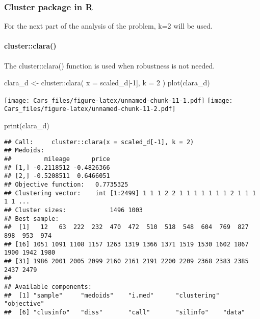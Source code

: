 \documentclass[
]{article}
\newenvironment{Shaded}{\begin{snugshade}}{\end{snugshade}}
\newcommand{\AttributeTok}[1]{\textcolor[rgb]{0.77,0.63,0.00}{#1}}
\newcommand{\DecValTok}[1]{\textcolor[rgb]{0.00,0.00,0.81}{#1}}
\newcommand{\FunctionTok}[1]{\textcolor[rgb]{0.00,0.00,0.00}{#1}}
\newcommand{\NormalTok}[1]{#1}
\newcommand{\OtherTok}[1]{\textcolor[rgb]{0.56,0.35,0.01}{#1}}
\newcommand{\SpecialCharTok}[1]{\textcolor[rgb]{0.00,0.00,0.00}{#1}}
\begin{document}
\hypertarget{cluster-package-in-r}{%
\subsubsection{Cluster package in R}\label{cluster-package-in-r}}

For the next part of the analysis of the problem, k=2 will be used.

\hypertarget{clusterclara}{%
\paragraph{cluster::clara()}\label{clusterclara}}

The cluster::clara() function is used when robustness is not needed.

\begin{Shaded}
\begin{Highlighting}[]
\NormalTok{clara\_d }\OtherTok{\textless{}{-}}\NormalTok{ cluster}\SpecialCharTok{::}\FunctionTok{clara}\NormalTok{(}
  \AttributeTok{x =}\NormalTok{ scaled\_d[}\SpecialCharTok{{-}}\DecValTok{1}\NormalTok{],}
  \AttributeTok{k =} \DecValTok{2}
\NormalTok{)}
\FunctionTok{plot}\NormalTok{(clara\_d)}
\end{Highlighting}
\end{Shaded}

\texttt{[image: Cars\_files/figure-latex/unnamed-chunk-11-1.pdf]}
\texttt{[image: Cars\_files/figure-latex/unnamed-chunk-11-2.pdf]}

\begin{Shaded}
\begin{Highlighting}[]
\FunctionTok{print}\NormalTok{(clara\_d)}
\end{Highlighting}
\end{Shaded}

\begin{verbatim}
## Call:     cluster::clara(x = scaled_d[-1], k = 2) 
## Medoids:
##         mileage      price
## [1,] -0.2118512 -0.4826366
## [2,] -0.5208511  0.6466051
## Objective function:   0.7735325
## Clustering vector:    int [1:2499] 1 1 1 2 2 1 1 1 1 1 1 1 2 1 1 1 1 1 ...
## Cluster sizes:            1496 1003 
## Best sample:
##  [1]   12   63  222  232  470  472  510  518  548  604  769  827  898  953  974
## [16] 1051 1091 1108 1157 1263 1319 1366 1371 1519 1530 1602 1867 1900 1942 1980
## [31] 1986 2001 2005 2099 2160 2161 2191 2200 2209 2368 2383 2385 2437 2479
## 
## Available components:
##  [1] "sample"     "medoids"    "i.med"      "clustering" "objective" 
##  [6] "clusinfo"   "diss"       "call"       "silinfo"    "data"
\end{verbatim}
\end{document}
